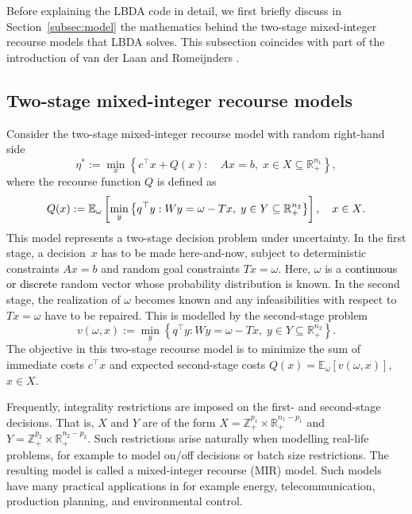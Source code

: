 \documentclass[12pt, english]{article}
\newcommand{\red}{\textcolor{black}}
\begin{document}
Before explaining the LBDA code in detail, we first briefly discuss in Section~\ref{subsec:model} the mathematics behind the two-stage mixed-integer recourse models that LBDA solves. This subsection coincides with part of the introduction of van der Laan and Romeijnders \cite{vanderLaan2020}.

\subsection{Two-stage mixed-integer recourse models\label{subsec:model}}

Consider the two-stage mixed-integer recourse model with random right-hand side \begin{equation}\label{etastar}\eta^* := \min_{x}\left\{c^{\top}x + Q(x) :\quad Ax = b,\;x \in X\subseteq \mathbb{R}^{n_1}_+\right\},\end{equation} where the recourse function $Q$ is defined as \begin{equation}\label{defQ}Q(x):=\mathbb{E}_{\omega}\left[ \min_y \left\{   q^{\top}y: Wy = \omega - Tx,\; y \in Y \subseteq \mathbb R^{n_2 }_+\right\}\right]  , \quad x\in \red{X}. \end{equation}This model represents a two-stage decision problem under uncertainty. In the first stage, a decision~$x$ has to be made here-and-now, subject to deterministic constraints $Ax = b$ and random goal constraints $Tx = \omega$. Here, $\omega$ is a \red{continuous or discrete} random vector whose probability distribution is known. In the second stage, the realization of $\omega$ becomes known and any infeasibilities with respect to $Tx = \omega$ have to be repaired. This is modelled by the second-stage problem \begin{equation}\label{vwx}v(\omega,x) := \min_y \left\{   q^{\top}y:Wy = \omega - Tx,\; y \in Y \subseteq  \mathbb{R} ^{n_2 }_+\right\}.\end{equation}The objective in this two-stage recourse model is to minimize the sum of immediate costs $c^{\top}x$ and expected second-stage costs $Q(x) = \mathbb{E}_\omega[v(\omega,x)]$, ${x \in X}$.

Frequently, integrality restrictions are imposed on the first- and second-stage decisions. That is, $X$ and $Y$ are of the form $X = \mathbb Z^{p_1}_+ \times \mathbb{R}^{n_1 - p_1}_+$ and $Y = \mathbb Z^{p_2}_+\times \mathbb{R}^{n_2 - p_2}_+$. Such restrictions arise naturally when modelling real-life problems, for example to model on/off decisions or batch size restrictions. The resulting model is called a mixed-integer recourse (MIR) model.
Such models have many practical applications in for example energy, telecommunication, production planning, and environmental control.
\end{document}
